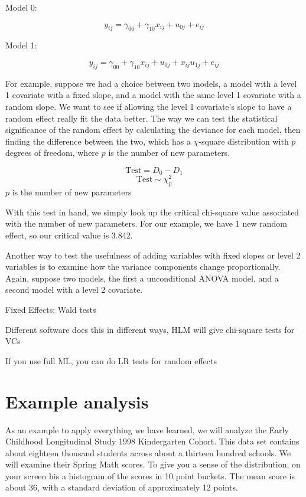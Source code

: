 Model 0:

\[
y_{ij}= \gamma_{00} + \gamma_{10}x_{ij} + u_{0j} + e_{ij}
\]

Model 1:

\[
y_{ij}= \gamma_{00} + \gamma_{10}x_{ij} + u_{0j} +x_{ij}u_{1j} + e_{ij}
\]

For example, suppose we had a choice between two models, a model with a level 1 covariate with a fixed slope, and a model with the same level 1 covariate with a random slope. We want to see if allowing the level 1 covariate's slope to have a random effect really fit the data better.  The way we can test the statistical significance of the random effect by calculating the deviance for each model, then finding the difference between the two, which has a $\chi$-square distribution with $p$ degrees of freedom, where $p$ is the number of new parameters.

\[
\mbox{Test} = D_0 - D_1
\]
\[
\mbox{Test} \sim \chi^2_p
\]
$p$ is the number of new parameters


With this test in hand, we simply look up the critical chi-square value associated with the number of new parameters. For our example, we have 1 new random effect, so our critical value is 3.842.

Another way to test the usefulness of adding variables with fixed slopes or level 2 variables is to examine how the variance components change proportionally. Again, suppose two models, the first a unconditional ANOVA model, and a second model with a level 2 covariate.

Fixed Effects: Wald tests

Different software does this in different ways, HLM will give chi-square tests for VCs

If you use full ML, you can do LR tests for random effects

\section{Example analysis}

As an example to apply everything we have learned, we will analyze the Early Childhood Longitudinal Study 1998 Kindergarten Cohort. This data set contains about eighteen thousand students across about a thirteen hundred schools.   We will examine their Spring Math scores. To give you a sense of the distribution, on your screen his a histogram of the scores in 10 point buckets. The mean score is about 36, with a standard deviation of approximately 12 points.

